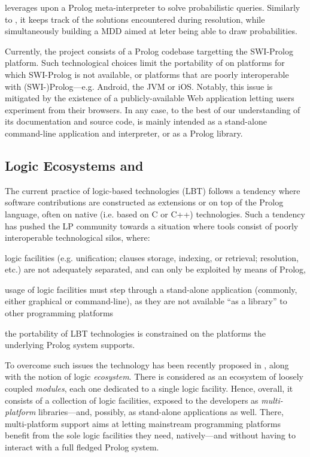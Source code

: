 \documentclass[12pt,a4paper,openright,twoside]{book}
\begin{document}
\cplint{} leverages upon a Prolog meta-interpreter to solve probabilistic queries.
%
Similarly to \problog{}, it keeps track of the solutions encountered during resolution, while simultaneously building a MDD aimed at leter being able to draw probabilities.

Currently, the \cplint{} project consists of a Prolog codebase targetting the SWI-Prolog \cite{WielemakerSTL12} platform.
%
Such technological choices limit the portability of \cplint{} on platforms for which SWI-Prolog is not available, or platforms that are poorly interoperable with (SWI-)Prolog---e.g. Android, the JVM or iOS.
%
Notably, this issue is mitigated by the existence of a publicly-available Web application letting users experiment \cplint{} from their browsers.
%
In any case, to the best of our understanding of its documentation and source code, \cplint{} is mainly intended as a stand-alone command-line application and interpreter, or as a Prolog library.

\subsection{Logic Ecosystems and \twopkt}\label{ssec:2pkt}

The current practice of logic-based technologies (LBT) follows a tendency where software contributions are constructed as extensions or on top of the Prolog language, often on native (i.e. based on C or C++) technologies.
%
Such a tendency has pushed the LP community towards a situation where tools consist of poorly interoperable technological silos, where:
%
\begin{inlinelist}
    \item logic facilities (e.g. unification; clauses storage, indexing, or retrieval; resolution, etc.) are not adequately separated, and can only be exploited by means of Prolog,
    \item usage of logic facilities must step through a stand-alone application (commonly, either graphical or command-line), as they are not available ``as a library'' to other programming platforms
    \item the portability of LBT technologies is constrained on the platforms the underlying Prolog system supports.
\end{inlinelist}

To overcome such issues the \twopkt{} technology has been recently proposed in \cite{cco-softwarex-2021-2pkt}, along with the notion of logic \emph{ecosystem}.
%
There \twopkt{} is considered as an ecosystem of loosely coupled \emph{modules}, each one dedicated to a single logic facility.
%
Hence, overall, it consists of a collection of logic facilities, exposed to the developers as \emph{multi-platform} libraries---and, possibly, as stand-alone applications as well.
%
There, multi-platform support aims at letting mainstream programming platforms benefit from the sole logic facilities they need, natively---and without having to interact with a full fledged Prolog system.
\end{document}
